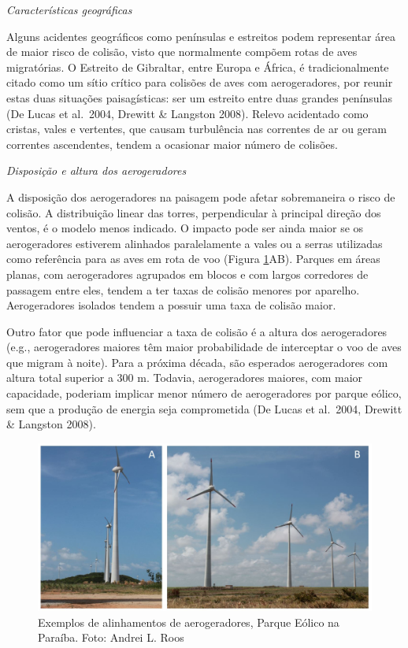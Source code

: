 \documentclass[
  oneside]{scrbook}
\begin{document}
\emph{Características geográficas}

Alguns acidentes geográficos como penínsulas e estreitos podem representar área de maior risco de colisão, visto que normalmente compõem rotas de aves migratórias. O Estreito de Gibraltar, entre Europa e África, é tradicionalmente citado como um sítio crítico para colisões de aves com aerogeradores, por reunir estas duas situações paisagísticas: ser um estreito entre duas grandes penínsulas (De Lucas et al.~2004, Drewitt \& Langston 2008). Relevo acidentado como cristas, vales e vertentes, que causam turbulência nas correntes de ar ou geram correntes ascendentes, tendem a ocasionar maior número de colisões.

\emph{Disposição e altura dos aerogeradores}

A disposição dos aerogeradores na paisagem pode afetar sobremaneira o risco de colisão. A distribuição linear das torres, perpendicular à principal direção dos ventos, é o modelo menos indicado. O impacto pode ser ainda maior se os aerogeradores estiverem alinhados paralelamente a vales ou a serras utilizadas como referência para as aves em rota de voo (Figura \ref{fig:13}AB). Parques em áreas planas, com aerogeradores agrupados em blocos e com largos corredores de passagem entre eles, tendem a ter taxas de colisão menores por aparelho. Aerogeradores isolados tendem a possuir uma taxa de colisão maior.

Outro fator que pode influenciar a taxa de colisão é a altura dos aerogeradores (e.g., aerogeradores maiores têm maior probabilidade de interceptar o voo de aves que migram à noite). Para a próxima década, são esperados aerogeradores com altura total superior a 300 m. Todavia, aerogeradores maiores, com maior capacidade, poderiam implicar menor número de aerogeradores por parque eólico, sem que a produção de energia seja comprometida (De Lucas et al.~2004, Drewitt \& Langston 2008).

\begin{figure}[H]

{\centering \includegraphics[width=0.75\linewidth]{imagens/cap04/Figura_4.2ab} 

}

\caption{Exemplos de alinhamentos de aerogeradores, Parque Eólico na Paraíba. Foto: Andrei L. Roos}\label{fig:13}
\end{figure}
\end{document}
